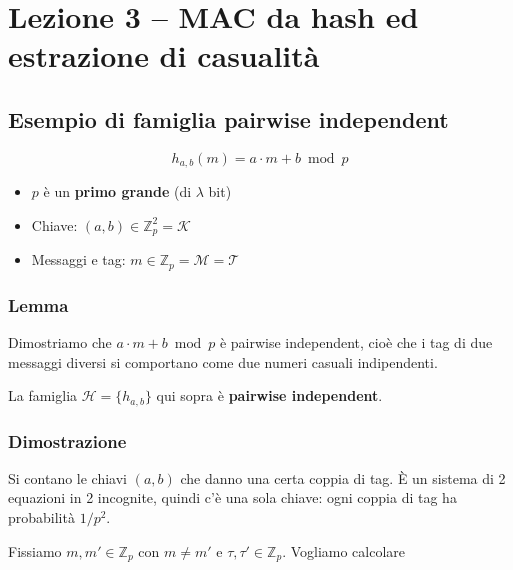 
\chapter{Lezione 3 -- MAC da hash ed estrazione di casualità}

\section{Esempio di famiglia pairwise independent}

\[
h_{a,b}(m) = a \cdot m + b \bmod p
\]

\begin{itemize}
\tightlist
\item
  \(p\) è un \textbf{primo grande} (di \(\lambda\) bit)
\item
  Chiave: \((a, b) \in \mathbb{Z}_p^2 = \mathcal{K}\)
\item
  Messaggi e tag: \(m \in \mathbb{Z}_p = \mathcal{M} = \mathcal{T}\)
\end{itemize}

\subsection{Lemma}

\begin{inbreve}

Dimostriamo che \(a \cdot m + b \bmod p\) è pairwise independent, cioè che i tag di due messaggi diversi si comportano come due numeri casuali indipendenti.

\end{inbreve}

La famiglia \(\mathcal{H} = \{h_{a,b}\}\) qui sopra è \textbf{pairwise independent}.

\subsection{Dimostrazione}

\begin{inbreve}

Si contano le chiavi \((a, b)\) che danno una certa coppia di tag. È un sistema di 2 equazioni in 2 incognite, quindi c'è una sola chiave: ogni coppia di tag ha probabilità \(1/p^2\).

\end{inbreve}

Fissiamo \(m, m' \in \mathbb{Z}_p\) con \(m \ne m'\) e \(\tau, \tau' \in \mathbb{Z}_p\). Vogliamo calcolare

